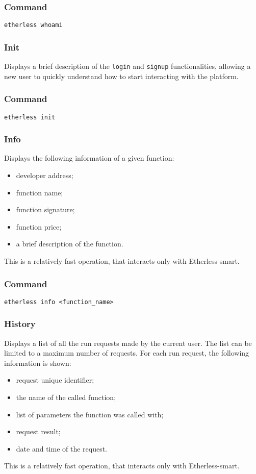 	\subsubsection*{Command}
	\texttt{etherless whoami}
	\subsubsection{Init}
	Displays a brief description of the \texttt{login} and \texttt{signup} functionalities, allowing a new user to quickly understand how to start interacting with the platform.
	\subsubsection*{Command}
	\texttt{etherless init}
	\subsubsection{Info}
	Displays the following information of a given function:
	\begin{itemize}
		\item developer address;
		\item function name;
		\item function signature;
		\item function price;
		\item a brief description of the function.
	\end{itemize}
	This is a relatively fast operation, that interacts only with Etherless-smart.
	\subsubsection*{Command}
	\texttt{etherless info <function\_name>}
	\subsubsection{History}
	Displays a list of all the run requests made by the current user. The list can be limited to a maximum number of requests. For each run request, the following information is shown:
	\begin{itemize}
		\item request unique identifier;
		\item the name of the called function;
		\item list of parameters the function was called with;
		\item request result;
		\item date and time of the request.
	\end{itemize}
	This is a relatively fast operation, that interacts only with Etherless-smart.
